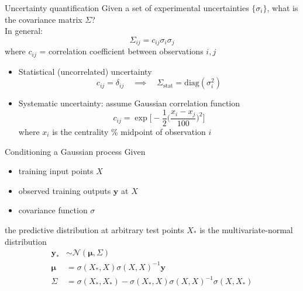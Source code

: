 \documentclass{beamer}
\begin{document}
\appendix


\begin{frame}{Uncertainty quantification}
  Given a set of experimental uncertainties $\{\sigma_i\}$, what is the covariance matrix $\Sigma$? \\[.5ex]
  In general:
  \begin{equation*}
    \Sigma_{ij} = c_{ij} \sigma_i \sigma_j
  \end{equation*}
  where $c_{ij}$ = correlation coefficient between observations $i,j$
  \begin{itemize}
    \item Statistical (uncorrelated) uncertainty
      \begin{equation*}
        c_{ij} = \delta_{ij} \quad\implies\quad \Sigma_\text{stat} = \text{diag}(\sigma_i^2)
      \end{equation*}
    \item Systematic uncertainty: assume Gaussian correlation function
      \begin{equation*}
        c_{ij} = \exp\Biggl[ -\frac{1}{2} \biggl( \frac{x_i - x_j}{100} \biggr)^2 \Biggr]
      \end{equation*}
      where $x_i$ is the centrality \% midpoint of observation $i$
  \end{itemize}
\end{frame}

\begin{frame}{Conditioning a Gaussian process}
  \newcommand{\y}{\mathbf y}
  Given
  \begin{itemize}
    \item training input points $X$
    \item observed training outputs $\y$ at $X$
    \item covariance function $\sigma$
  \end{itemize}
  the predictive distribution at arbitrary test points $X_*$ is the multivariate-normal distribution
  \begin{align*}
    \y_* &\sim \mathcal N(\boldsymbol\mu, \Sigma) \\
    \boldsymbol\mu &= \sigma(X_*, X)\sigma(X, X)^{-1}\y \\
    \Sigma &= \sigma(X_*,X_*) - \sigma(X_*,X)\sigma(X,X)^{-1}\sigma(X,X_*)
  \end{align*}
\end{frame}
\end{document}
